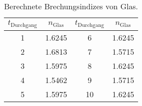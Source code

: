 \begin{table}
  \centering
  \caption{Berechnete Brechungsindizes von Glas.}
  \label{tabular_03}
  \begin{tabular}{c c | c c}
    \toprule
   \multicolumn{1}{c}{$t_\text{Durchgang}$} & \multicolumn{1}{c}{$n_\text{Glas}$} & \multicolumn{1}{c}{$t_\text{Durchgang}$} & \multicolumn{1}{c}{$n_\text{Glas}$}\\
   \midrule
    \num{1} & \num{1.6245} & \num{6 } & \num{1.6245} \\
    \num{2} & \num{1.6813} & \num{7 } & \num{1.5715} \\
    \num{3} & \num{1.5975} & \num{8 } & \num{1.6245} \\
    \num{4} & \num{1.5462} & \num{9 } & \num{1.5715} \\
    \num{5} & \num{1.5975} & \num{10} & \num{1.6245} \\
\bottomrule
  \end{tabular}
\end{table}
